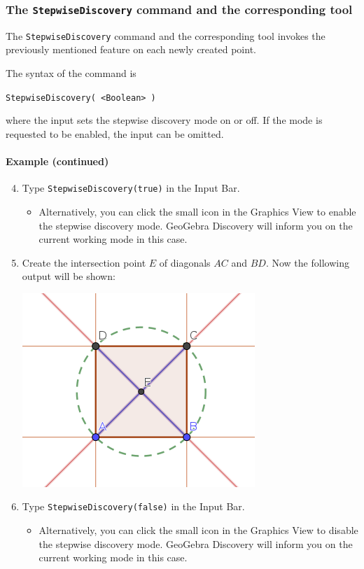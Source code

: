 \documentclass{article}
\begin{document}
\subsubsection{The \texttt{StepwiseDiscovery} command and the corresponding tool}

The \texttt{StepwiseDiscovery} command and the corresponding tool invokes the previously mentioned feature on each newly created point.

The syntax of the command is
\begin{center}
    \texttt{StepwiseDiscovery( <Boolean> )}
\end{center}
where the input sets the stepwise discovery mode on or off. If the mode is requested to be enabled, the input can be omitted.

\paragraph{Example (continued)}
\begin{enumerate}
\setcounter{enumi}{3}
    \item Type \texttt{StepwiseDiscovery(true)} in the Input Bar.
    \begin{itemize}
        \item Alternatively, you can click the small  icon in the Graphics View to enable the stepwise discovery mode.
        GeoGebra Discovery will inform you on the current working mode in this case.
    \end{itemize}
    \item Create the intersection point $E$ of diagonals $AC$ and $BD$. Now the following output will be shown:
    \begin{center}
    \includegraphics[scale=0.5]{StepwiseDiscovery-example}
    \end{center}
    \item Type \texttt{StepwiseDiscovery(false)} in the Input Bar.
    \begin{itemize}
        \item Alternatively, you can click the small  icon in the Graphics View to disable the stepwise discovery mode.
        GeoGebra Discovery will inform you on the current working mode in this case.
    \end{itemize}
\end{enumerate}
\end{document}
